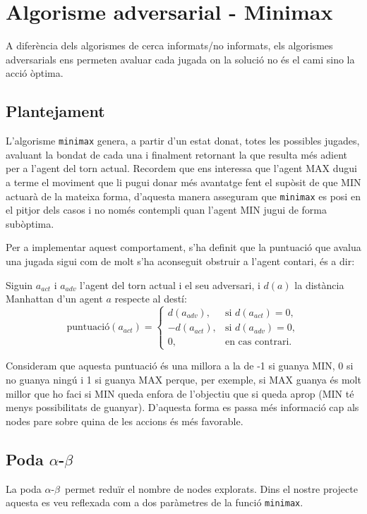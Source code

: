 \documentclass[12pt,a4paper]{report}
\begin{document}
\newcommand{\alphabeta}{\(\alpha\)\textnormal{-}\(\beta\)}

\chapter{Algorisme adversarial - Minimax}
\label{ch:minimax}
A diferència dels algorismes de cerca informats/no informats, els algorismes adversarials ens permeten avaluar cada jugada
on la solució no és el cami sino la acció òptima.

\section{Plantejament}
L'algorisme \texttt{minimax} genera, a partir d'un estat donat, totes les possibles jugades, avaluant la bondat de cada una
i finalment retornant la que resulta més adient per a l'agent del torn actual. Recordem que ens interessa que l'agent
MAX dugui a terme el moviment que li pugui donar més avantatge fent el supòsit de que MIN actuarà de la mateixa forma,
d'aquesta manera asseguram que \texttt{minimax} es posi en el pitjor dels casos i no només contempli quan l'agent MIN jugui de forma subòptima.

Per a implementar aquest comportament, s'ha definit que la puntuació que avalua una jugada sigui com de molt s'ha aconseguit
obstruir a l'agent contari, és a dir:

Siguin $a_{act}$ i $a_{adv}$ l’agent del torn actual i el seu adversari, 
i $d(a)$ la distància Manhattan d’un agent $a$ respecte al destí:
\[
\text{puntuació}(a_{act}) =
\begin{cases}
d(a_{adv}), & \text{si } d(a_{act}) = 0, \\
-d(a_{act}), & \text{si } d(a_{adv}) = 0, \\
0, & \text{en cas contrari.}
\end{cases}
\]

Consideram que aquesta puntuació és una millora a la de -1 si guanya MIN, 0 si no guanya ningú i 1 si guanya MAX perque,
per exemple, si MAX guanya és molt millor que ho faci si MIN queda enfora de l'objectiu que si queda aprop (MIN té menys possibilitats de guanyar).
D'aquesta forma es passa més informació cap als nodes pare sobre quina de les accions és més favorable.

\newpage
\vspace*{0.01cm}
\section{Poda \alphabeta}
La poda \alphabeta\ permet reduïr el nombre de nodes explorats. Dins el nostre projecte aquesta es veu reflexada 
com a dos paràmetres de la funció \texttt{minimax}.
\end{document}
